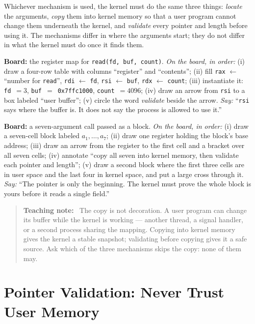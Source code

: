 \documentclass[11pt]{article}
\newenvironment{teachingaside}{\begin{quote}\small\color{primary-gold}\textbf{Teaching note:}\ }{\end{quote}}
\begin{document}
Whichever mechanism is used, the kernel must do the same three things: \emph{locate} the arguments, \emph{copy} them into kernel memory so that a user program cannot change them underneath the kernel, and \emph{validate} every pointer and length before using it. The mechanisms differ in where the arguments start; they do not differ in what the kernel must do once it finds them.

\textbf{Board:} the register map for \texttt{read(fd, buf, count)}. \emph{On the board, in order:} (i) draw a four-row table with columns ``register'' and ``contents''; (ii) fill \texttt{rax} $\leftarrow$ ``number for \texttt{read}'', \texttt{rdi} $\leftarrow$ \texttt{fd}, \texttt{rsi} $\leftarrow$ \texttt{buf}, \texttt{rdx} $\leftarrow$ \texttt{count}; (iii) instantiate it: \texttt{fd}~$=3$, \texttt{buf}~$=$~\texttt{0x7ffc1000}, \texttt{count}~$=4096$; (iv) draw an arrow from \texttt{rsi} to a box labeled ``user buffer''; (v) circle the word \emph{validate} beside the arrow. \emph{Say:} ``\texttt{rsi} says where the buffer is. It does not say the process is allowed to use it.''

\textbf{Board:} a seven-argument call passed as a block. \emph{On the board, in order:} (i) draw a seven-cell block labeled $a_1,\dots,a_7$; (ii) draw one register holding the block's base address; (iii) draw an arrow from the register to the first cell and a bracket over all seven cells; (iv) annotate ``copy all seven into kernel memory, then validate each pointer and length''; (v) draw a second block where the first three cells are in user space and the last four in kernel space, and put a large cross through it. \emph{Say:} ``The pointer is only the beginning. The kernel must prove the whole block is yours before it reads a single field.''

\begin{teachingaside}
The copy is not decoration. A user program can change its buffer while the kernel is working --- another thread, a signal handler, or a second process sharing the mapping. Copying into kernel memory gives the kernel a stable snapshot; validating before copying gives it a safe source. Ask which of the three mechanisms skips the copy: none of them may.
\end{teachingaside}

\section{Pointer Validation: Never Trust User Memory}
\end{document}
